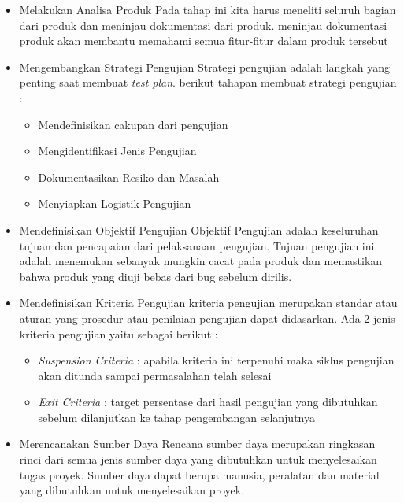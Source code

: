 \begin{itemize}
	\item {Melakukan Analisa Produk}
	\newline Pada tahap ini kita harus meneliti seluruh bagian dari produk dan  meninjau dokumentasi dari produk. meninjau dokumentasi produk akan membantu memahami semua fitur-fitur dalam produk tersebut
	
	\item {Mengembangkan Strategi Pengujian}
	\newline Strategi pengujian adalah langkah yang penting saat membuat \textit{test plan}. berikut tahapan membuat strategi pengujian :
	\begin{itemize}
		\itemsep0em
		\item Mendefinisikan cakupan dari pengujian
		\item Mengidentifikasi Jenis Pengujian
		\item Dokumentasikan Resiko dan Masalah
		\item Menyiapkan Logistik Pengujian
	\end{itemize}
	
	\item {Mendefinisikan Objektif Pengujian}
	\newline Objektif Pengujian adalah keseluruhan tujuan dan pencapaian dari pelaksanaan pengujian. Tujuan pengujian ini adalah menemukan sebanyak mungkin cacat pada produk dan memastikan bahwa produk yang diuji bebas dari bug sebelum dirilis.
	
	\item Mendefinisikan Kriteria Pengujian
	\newline kriteria pengujian merupakan standar atau aturan yang prosedur atau penilaian pengujian dapat didasarkan. Ada 2 jenis kriteria pengujian yaitu sebagai berikut :
	\begin{itemize}
		\itemsep0em
		\item \textit{Suspension Criteria} : apabila kriteria ini terpenuhi maka siklus pengujian akan ditunda sampai permasalahan telah selesai
		\item \textit{Exit Criteria} : target persentase dari hasil pengujian yang dibutuhkan sebelum dilanjutkan ke tahap pengembangan selanjutnya
	\end{itemize}

	\item {Merencanakan Sumber Daya}
	\newline Rencana sumber daya merupakan ringkasan rinci dari semua jenis sumber daya yang dibutuhkan untuk menyelesaikan tugas proyek. Sumber daya dapat berupa manusia, peralatan dan material yang dibutuhkan untuk menyelesaikan proyek.
	

\end{itemize}
